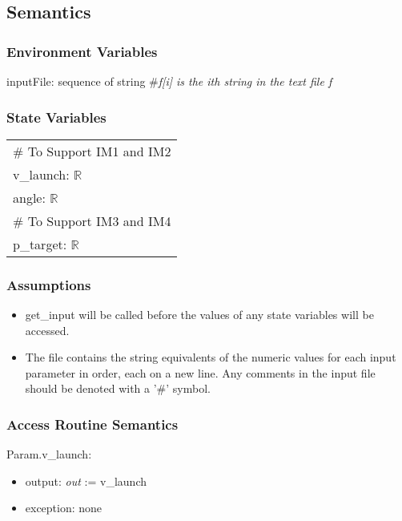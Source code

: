 \documentclass[12pt, titlepage]{article}
\begin{document}
\subsection{Semantics}

\subsubsection{Environment Variables}

inputFile: sequence of string \#\textit{f[i] is the ith string in the text file f}

\subsubsection{State Variables}

\renewcommand{\arraystretch}{1.2}
\begin{longtable*}[l]{l} 
\# To Support IM1 and IM2 \\
v\_launch: $\mathbb{R}$\\
angle: $\mathbb{R}$\\
\# To Support IM3 and IM4 \\
p\_target: $\mathbb{R}$\\
\end{longtable*}

\subsubsection{Assumptions}

\begin{itemize}

\item get\_input will be called before the values of any state variables will 
be accessed.

\item The file contains the string equivalents of the numeric values for
each input parameter in order, each on a new line. Any comments in the input file 
should be denoted with a '\#' symbol.

\end{itemize}

\subsubsection{Access Routine Semantics}

\noindent Param.v\_launch:
\begin{itemize}
\item output: \textit{out} := v\_launch
\item exception: none
\end{itemize}
\end{document}
